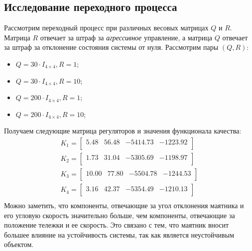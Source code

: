 \subsection{Исследование переходного процесса}
Рассмотрим переходный процесс при различных весовых матрицах $Q$ и $R$. Матрица $R$ отвечает за 
штраф за \textit{агрессивное} управление, а матрица $Q$ отвечает за штраф за отклонение состояния системы от нуля.
Рассмотрим пары $(Q, R)$:
\begin{itemize}
    \item $Q = 30 \cdot I_{4\times 4}, R = 1$;
    \item $Q = 30 \cdot I_{4\times 4}, R = 10$;
    \item $Q = 200 \cdot I_{4\times 4}, R = 1$;
    \item $Q = 200 \cdot I_{4\times 4}, R = 10$;
\end{itemize}
Получаем следующие матрица регуляторов и значения функционала качества:
\begin{equation}
    \begin{array}{cccc}
        K_1 = \begin{bmatrix}
        5.48  & 56.48  & -5414.73  & -1223.92 \\ 
        \end{bmatrix} \\ 
        K_2 = \begin{bmatrix}
        1.73  & 31.04  & -5305.69  & -1198.97 \\ 
        \end{bmatrix} \\ 
        K_3 = \begin{bmatrix}
        10.00  & 77.80  & -5504.78  & -1244.53 \\
        \end{bmatrix} \\ 
        K_4 = \begin{bmatrix}
        3.16  & 42.37  & -5354.49  & -1210.13 \\ 
        \end{bmatrix} \\ 
    \end{array}
\end{equation}
Можно заметить, что компоненты, отвечающие за угол отклонения маятника и его угловую скорость значительно больше, 
чем компоненты, отвечающие за положение тележки и ее скорость. Это связано с тем, что маятник вносит большее 
влияние на устойчивость системы, так как является неустойчивым объектом. 

